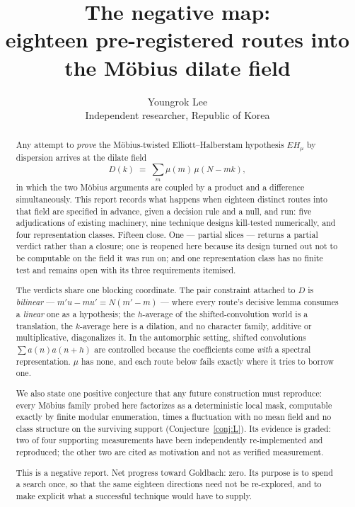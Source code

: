 \documentclass[11pt,a4paper]{article}
\title{The negative map:\\
eighteen pre-registered routes into the M\"obius dilate field}
\author{Youngrok Lee\\
\small Independent researcher, Republic of Korea}
\date{}
\theoremstyle{plain}
\theoremstyle{definition}
\theoremstyle{remark}
\begin{document}
\maketitle

\begin{abstract}
Any attempt to \emph{prove} the M\"obius-twisted
Elliott--Halberstam hypothesis $EH_\mu$ by dispersion arrives at the
dilate field
\[
  D(k)\;=\;\sum_{m}\mu(m)\,\mu(N-mk),
\]
in which the two M\"obius arguments are coupled by a product and a
difference simultaneously. This report records what happens when
eighteen distinct routes into that field are specified in advance,
given a decision rule and a null, and run: five adjudications of
existing machinery, nine technique designs kill-tested numerically,
and four representation classes. Fifteen close. One --- partial slices
--- returns a partial verdict rather than a closure; one is reopened
here because its design turned out not to be computable on the field
it was run on; and one representation class has no finite test and
remains open with its three requirements itemised.

The verdicts share one blocking coordinate. The pair constraint
attached to $D$ is \emph{bilinear} --- $m'u-mu'=N(m'-m)$ --- where
every route's decisive lemma consumes a \emph{linear} one as a
hypothesis; the $h$-average of the shifted-convolution world is a
translation, the $k$-average here is a dilation, and no character
family, additive or multiplicative, diagonalizes it. In the automorphic
setting, shifted convolutions $\sum a(n)a(n+h)$ are controlled because
the coefficients come \emph{with} a spectral representation. $\mu$ has
none, and each route below fails exactly where it tries to borrow one.

We also state one positive conjecture that any future construction
must reproduce: every M\"obius family probed here factorizes as a
deterministic local mask, computable exactly by finite modular
enumeration, times a fluctuation with no mean field and no class
structure on the surviving support (Conjecture~\ref{conj:L}). Its
evidence is graded: two of four supporting measurements have been
independently re-implemented and reproduced; the other two are cited
as motivation and not as verified measurement.

This is a negative report. Net progress toward Goldbach: zero. Its
purpose is to spend a search once, so that the same eighteen
directions need not be re-explored, and to make explicit what a
successful technique would have to supply.
\end{abstract}
\end{document}
